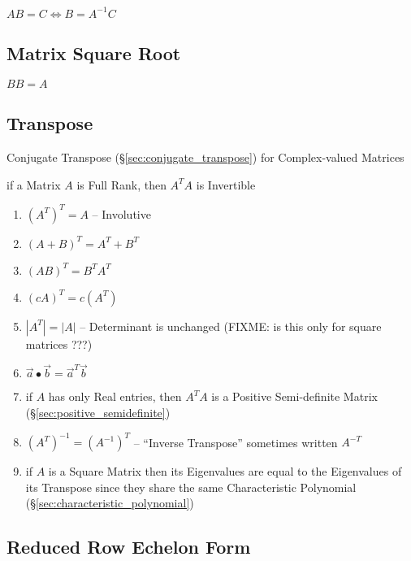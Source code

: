 $AB = C \Leftrightarrow B = A^{-1}C$



\subsection{Matrix Square Root}\label{sec:matrix_square_root}

$BB = A$



\subsection{Transpose}\label{sec:transpose}

Conjugate Transpose (\S\ref{sec:conjugate_transpose}) for Complex-valued
Matrices

if a Matrix $A$ is Full Rank, then $A^TA$ is Invertible

\begin{enumerate}
  \item $(A^T)^T = A$ -- Involutive
  \item $(A+B)^T = A^T + B^T$
  \item $(AB)^T = B^T A^T$
  \item $(cA)^T = c(A^T)$
  \item $|A^T| = |A|$ -- Determinant is unchanged (FIXME: is this only for
    square matrices ???)
  \item $\vec{a} \bullet \vec{b} = \vec{a}^T\vec{b}$
  \item if $A$ has only Real entries, then $A^T A$ is a Positive Semi-definite
    Matrix (\S\ref{sec:positive_semidefinite})
  \item $(A^T)^{-1} = (A^{-1})^T$ -- ``Inverse Transpose'' sometimes written
    $A^{-T}$
  \item if $A$ is a Square Matrix then its Eigenvalues are equal to the
    Eigenvalues of its Transpose since they share the same Characteristic
    Polynomial (\S\ref{sec:characteristic_polynomial})
\end{enumerate}



\subsection{Reduced Row Echelon Form}\label{sec:reduced_row_echelon}

